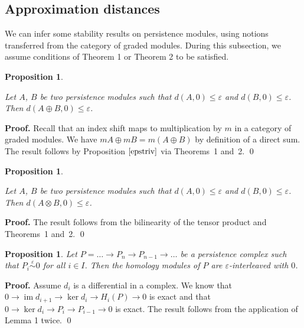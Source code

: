 \documentclass[english,12pt]{article}
\newcounter{stmcounter}[section]
\numberwithin{equation}{section}
\newtheorem{proposition}[stmcounter]{Proposition}
\theoremstyle{definition}
\theoremstyle{remark}
\newenvironment{pf}{\noindent\textbf{Proof.}}{\qed}
\renewcommand{\leq}{\leqslant}
\begin{document}
\subsection{Approximation distances}

We can infer some stability results on persistence modules, using notions transferred from the category of graded modules. During this subsection, we assume conditions of Theorem 1 or Theorem 2 to be satisfied.\\

\begin{proposition} ~ \par
  \label{prop:sum} 
  Let $A$, $B$ be two persistence modules such that $d(A,0) \leq \varepsilon$ and $d(B,0) \leq \varepsilon$. Then $d(A \oplus B,0) \leq \varepsilon$.
\end{proposition}

\begin{pf}
  Recall that an index shift maps to multiplication by $m$ in a category of graded modules. We have $mA \oplus mB = m(A \oplus B)$ by definition of a direct sum. The result follows by Proposition $\ref{epstriv}$ via Theorems~1 and~2.
\end{pf}

\begin{proposition} ~ \par
  \label{prop:tensor}
  Let $A$, $B$ be two persistence modules such that $d(A,0) \leq \varepsilon$ and $d(B,0) \leq \varepsilon$. Then $d(A \otimes B,0) \leq \varepsilon$.
\end{proposition}

\begin{pf}
  The result follows from the bilinearity of the tensor product and Theorems~1 and~2.
\end{pf}

\begin{proposition}
  \label{prop:hominter}
  Let $P = \ldots \to P_n \to P_{n-1} \to \ldots$ be a persistence complex such that $P_i \stackrel{\varepsilon}{\sim} 0$ for all $i \in I$. Then the homology modules of $P$ are $\varepsilon$-interleaved with $0$.
\end{proposition}

\begin{pf}
  Assume $d_i$ is a differential in a complex. We know that $0 \to \operatorname{im}{d_{i+1}} \to \ker{d_{i}} \to H_i(P) \to 0$ is exact and that $0 \to \ker{d_i} \to P_i \to P_{i-1} \to 0$ is exact. The result follows from the application of Lemma 1 twice.
\end{pf}\\
\end{document}
